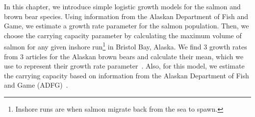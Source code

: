 
In this chapter, we introduce simple logistic growth models for the salmon and brown bear species.
Using information from the Alaskan Department of Fish and Game, we estimate a growth rate parameter for the salmon population.
Then, we choose the carrying capacity parameter by calculating the maximum volume of salmon for any given inshore run\footnote{Inshore runs are when salmon migrate back from the sea to spawn.} in Bristol Bay, Alaska.
We find 3 growth rates from 3 articles for the Alaskan brown bears and calculate their mean, which we use to represent their growth rate parameter~\cite{daele2010management,mclellan1989,mclellan1996}.
Also, for this model, we estimate the carrying capacity based on information from the Alaskan Department of Fish and Game (ADFG)~\cite{ADFG}.



